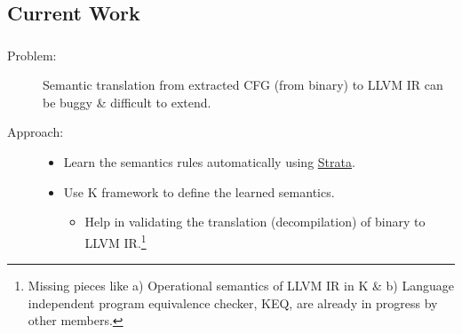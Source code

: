 \documentclass[mathserif,12pt,unknownkeysallowed]{beamer}
\begin{document}
  \subsection*{Current Work}
  \frame
  {
    \frametitle{\subsecname}
    \begin{description}
      \item [Problem:] Semantic translation from extracted CFG (from binary) to LLVM IR can be buggy \& difficult to extend.
      \item [Approach:]
        \begin{itemize}
          \item Learn the semantics rules automatically using \href{https://dl.acm.org/citation.cfm?id=2908121}{Strata}.
          \item Use K framework to define the learned semantics.
          \begin{itemize}
            \item Help in validating the translation (decompilation) of binary to LLVM IR.\footnote{ Missing pieces like a) Operational semantics  of LLVM IR in K \& b) Language independent program equivalence checker, KEQ, are already in progress by other members.}
          \end{itemize}
        \end{itemize}
    \end{description}

  }
\end{document}
